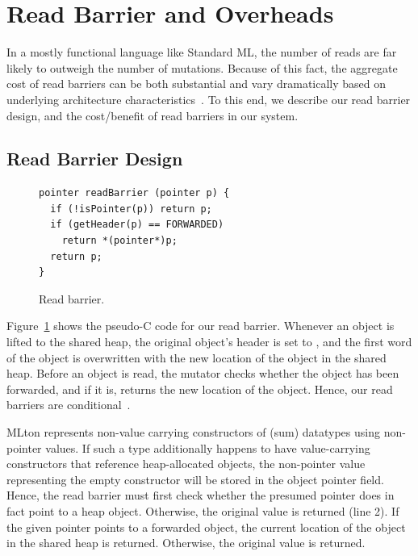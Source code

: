 \section{Read Barrier and Overheads}

In a mostly functional language like Standard ML, the number of reads are far
likely to outweigh the number of mutations. Because of this fact, the aggregate
cost of read barriers can be both substantial and vary dramatically based on
underlying architecture characteristics~\cite{Blackburn04}. To this end, we
describe our read barrier design, and the cost/benefit of read barriers in our
system.

\subsection{Read Barrier Design}

\begin{figure}
\centering
\begin{minipage}{3.5in}
\begin{lstlisting}
pointer readBarrier (pointer p) {
  if (!isPointer(p)) return p;
  if (getHeader(p) == FORWARDED)
    return *(pointer*)p;
  return p;
}
\end{lstlisting}
\end{minipage}
\caption{Read barrier.}
\label{code:read_barrier}
\end{figure}

Figure~\ref{code:read_barrier} shows the pseudo-C code for our read barrier.
Whenever an object is lifted to the shared heap, the original object's header
is set to , and the first word of the object is overwritten with
the new location of the object in the shared heap. Before an object is read,
the mutator checks whether the object has been forwarded, and if it is, returns
the new location of the object. Hence, our read barriers are
conditional~\cite{Blackburn04,Baker}.

MLton represents non-value carrying constructors of (sum) datatypes using
non-pointer values. If such a type additionally happens to have value-carrying
constructors that reference heap-allocated objects, the non-pointer value
representing the empty constructor will be stored in the object pointer field.
Hence, the read barrier must first check whether the presumed pointer does in
fact point to a heap object.  Otherwise, the original value is returned (line
2). If the given pointer points to a forwarded object, the current location of
the object in the shared heap is returned. Otherwise, the original value is
returned.

